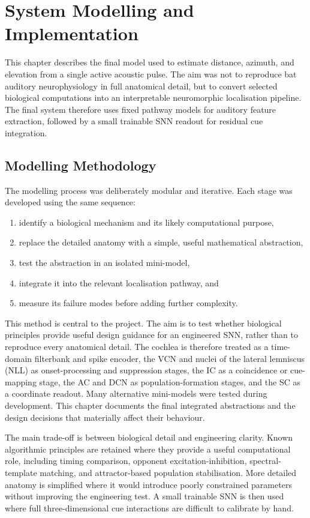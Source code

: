 \chapter{System Modelling and Implementation} \label{ch:modelling}

This chapter describes the final model used to estimate distance, azimuth, and elevation from a single active acoustic pulse. The aim was not to reproduce bat auditory neurophysiology in full anatomical detail, but to convert selected biological computations into an interpretable neuromorphic localisation pipeline. The final system therefore uses fixed pathway models for auditory feature extraction, followed by a small trainable SNN readout for residual cue integration.

\section{Modelling Methodology}

The modelling process was deliberately modular and iterative. Each stage was developed using the same sequence:
\begin{enumerate}
    \item identify a biological mechanism and its likely computational purpose,
    \item replace the detailed anatomy with a simple, useful mathematical abstraction,
    \item test the abstraction in an isolated mini-model,
    \item integrate it into the relevant localisation pathway, and
    \item measure its failure modes before adding further complexity.
\end{enumerate}

This method is central to the project. The aim is to test whether biological principles provide useful design guidance for an engineered SNN, rather than to reproduce every anatomical detail. The cochlea is therefore treated as a time-domain filterbank and spike encoder, the VCN and nuclei of the lateral lemniscus (NLL) as onset-processing and suppression stages, the IC as a coincidence or cue-mapping stage, the AC and DCN as population-formation stages, and the SC as a coordinate readout. Many alternative mini-models were tested during development. This chapter documents the final integrated abstractions and the design decisions that materially affect their behaviour.

The main trade-off is between biological detail and engineering clarity. Known algorithmic principles are retained where they provide a useful computational role, including timing comparison, opponent excitation-inhibition, spectral-template matching, and attractor-based population stabilisation. More detailed anatomy is simplified where it would introduce poorly constrained parameters without improving the engineering test. A small trainable SNN is then used where full three-dimensional cue interactions are difficult to calibrate by hand.

